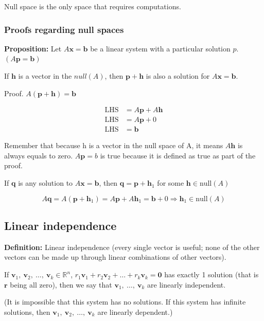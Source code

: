 \documentclass[
]{article}
\begin{document}
Null space is the only space that requires computations.


\subsubsection{Proofs regarding null
spaces}

\textbf{Proposition:} Let $A\mathbf{x} = \mathbf{b}$ be a
linear system with a particular solution $p$.
$(A\mathbf{p} = \mathbf{b})$

If $\mathbf{h}$ is a vector in the $null(A)$, then
$\mathbf{p} + \mathbf{h}$ is also a solution for
$A\mathbf{x} = \mathbf{b}$.

Proof.
$A\left( \mathbf{p} + \mathbf{h} \right) = \mathbf{b}$

\begin{align*}
\text{LHS} &= A\mathbf{p} + A\mathbf{h}
 \\
\text{LHS} &= A\mathbf{p} + 0
 \\
\text{LHS} &= \mathbf{b}
\end{align*}


Remember that because h is a vector in the null space of A, it means
$A\mathbf{h}$ is always equals to zero. $A\mathbf{p} = b$ is
true because it is defined as true as part of the proof.

If $\mathbf{q}$ is any solution to
$A\mathbf{x} = \mathbf{b}$, then
$\mathbf{q} = \mathbf{p} + {\mathbf{h}}_{1}$ for some
$\mathbf{h} \in \text{null}(A)$

$$A\mathbf{q} = A\left( \mathbf{p} + {\mathbf{h}}_{1} \right) = A\mathbf{p} + A{\mathbf{h}}_{1} = \mathbf{b} + 0 \Rightarrow {\mathbf{h}}_{1} \in \text{null}(A)$$


\subsection{Linear independence}

\textbf{Definition:} Linear independence (every single vector is useful;
none of the other vectors can be made up through linear combinations of
other vectors).

If
${\mathbf{v}}_{1},\ {\mathbf{v}}_{2},\ \ldots,\ {\mathbf{v}}_{k} \in \mathbb{R}^{n}$,
$r_{1}{\mathbf{v}}_{1} + r_{2}{\mathbf{v}}_{2} + \ldots + r_{k}{\mathbf{v}}_{k} = \mathbf{0}$
has exactly 1 solution (that is $\mathbf{r}$ being all zero), then
we say that ${\mathbf{v}}_{1},\ \ldots,\ {\mathbf{v}}_{k}$ are
linearly independent.

(It is impossible that this system has no solutions. If this system has
infinite solutions, then
${\mathbf{v}}_{1},\ {\mathbf{v}}_{2},\ \ldots,\ {\mathbf{v}}_{k}$
are linearly dependent.)
\end{document}
